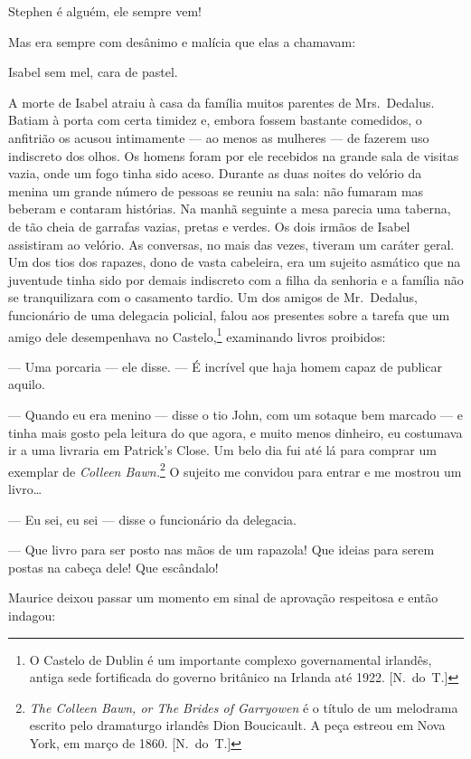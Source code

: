 Stephen é alguém, ele sempre vem!

Mas era sempre com desânimo e malícia que elas a chamavam:

Isabel sem mel, cara de pastel.

A morte de Isabel atraiu à casa da família muitos parentes de Mrs.~Dedalus.
Batiam à porta com certa timidez e, embora fossem bastante comedidos, o
anfitrião os acusou intimamente --- ao menos as mulheres --- de fazerem uso
indiscreto dos olhos.  Os homens foram por ele recebidos na grande sala de
visitas vazia, onde um fogo tinha sido aceso.  Durante as duas noites do
velório da menina um grande número de pessoas se reuniu na sala: não fumaram
mas beberam e contaram histórias.  Na manhã seguinte a mesa parecia uma
taberna, de tão cheia de garrafas vazias, pretas e verdes.  Os dois irmãos de
Isabel assistiram ao velório.  As conversas, no mais das vezes, tiveram um
caráter geral.  Um dos tios dos rapazes, dono de vasta cabeleira, era um
sujeito asmático que na juventude tinha sido por demais indiscreto com a filha
da senhoria e a família não se tranquilizara com o casamento tardio.  Um dos
amigos de Mr.~Dedalus, funcionário de uma delegacia policial, falou aos
presentes sobre a tarefa que um amigo dele desempenhava no Castelo,\footnote{ O
Castelo de Dublin é um importante complexo governamental irlandês, antiga sede
fortificada do governo britânico na Irlanda até 1922. [N.~do~T.]}  examinando
livros proibidos:

--- Uma porcaria --- ele disse.  --- É incrível que haja homem capaz de publicar
aquilo.

--- Quando eu era menino --- disse o tio John, com um sotaque bem marcado --- e
tinha mais gosto pela leitura do que agora, e muito menos dinheiro, eu
costumava ir a uma livraria em Patrick’s Close.  Um belo dia fui até lá para
comprar um exemplar de \textit{Colleen Bawn.}\footnote[\setcounter{symbol}{2}]{ \textit{The Colleen
Bawn, or The Brides of Garryowen} é o título de um melodrama escrito pelo
dramaturgo irlandês Dion Boucicault.  A peça estreou em Nova York, em março de
1860. [N.~do~T.]}  O sujeito me convidou para entrar e me mostrou um livro\ldots{}

--- Eu sei, eu sei --- disse o funcionário da delegacia.

--- Que livro para ser posto nas mãos de um rapazola!  Que ideias para serem
postas na cabeça dele!  Que escândalo!

Maurice deixou passar um momento em sinal de aprovação respeitosa e então
indagou:


